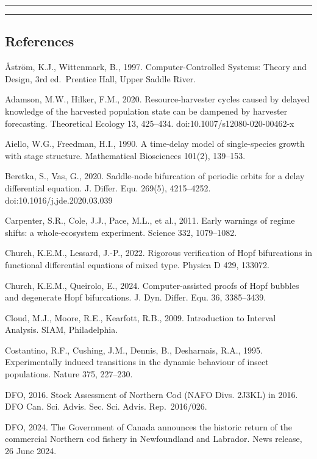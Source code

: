 \documentclass[11pt]{article}
\begin{document}
\begin{center}\rule{0.5\linewidth}{0.5pt}\end{center}

\begin{center}\rule{0.5\linewidth}{0.5pt}\end{center}

\subsection{References}\label{references}

\AA{}str\"om, K.J., Wittenmark, B., 1997. Computer-Controlled Systems: Theory
and Design, 3rd ed.~Prentice Hall, Upper Saddle River.

Adamson, M.W., Hilker, F.M., 2020. Resource-harvester cycles caused by
delayed knowledge of the harvested population state can be dampened by
harvester forecasting. Theoretical Ecology 13, 425--434.
doi:10.1007/s12080-020-00462-x

Aiello, W.G., Freedman, H.I., 1990. A time-delay model of single-species
growth with stage structure. Mathematical Biosciences 101(2), 139--153.

Beretka, S., Vas, G., 2020. Saddle-node bifurcation of periodic orbits
for a delay differential equation. J. Differ. Equ. 269(5), 4215--4252.
doi:10.1016/j.jde.2020.03.039

Carpenter, S.R., Cole, J.J., Pace, M.L., et al., 2011. Early warnings of
regime shifts: a whole-ecosystem experiment. Science 332, 1079--1082.

Church, K.E.M., Lessard, J.-P., 2022. Rigorous verification of Hopf
bifurcations in functional differential equations of mixed type. Physica
D 429, 133072.

Church, K.E.M., Queirolo, E., 2024. Computer-assisted proofs of Hopf
bubbles and degenerate Hopf bifurcations. J. Dyn. Differ. Equ. 36,
3385--3439.

Cloud, M.J., Moore, R.E., Kearfott, R.B., 2009. Introduction to Interval
Analysis. SIAM, Philadelphia.

Costantino, R.F., Cushing, J.M., Dennis, B., Desharnais, R.A., 1995.
Experimentally induced transitions in the dynamic behaviour of insect
populations. Nature 375, 227--230.

DFO, 2016. Stock Assessment of Northern Cod (NAFO Divs. 2J3KL) in 2016.
DFO Can. Sci. Advis. Sec. Sci. Advis. Rep.~2016/026.

DFO, 2024. The Government of Canada announces the historic return of the
commercial Northern cod fishery in Newfoundland and Labrador. News
release, 26 June 2024.
\end{document}
